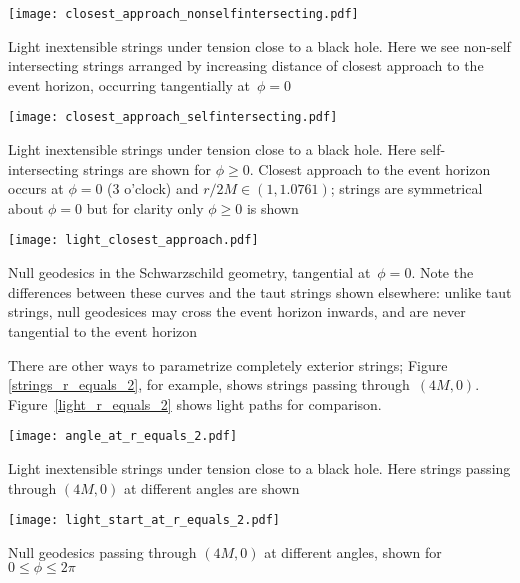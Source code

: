\documentclass{ws-tpe}
\begin{document}
\begin{figurehere} %
  \centerline{
    \texttt{[image: closest\_approach\_nonselfintersecting.pdf]}
  }
  \caption{Light inextensible strings under tension close to a black
    hole.  Here we see non-self intersecting strings arranged by
    increasing distance of closest approach to the event horizon,
    occurring tangentially at~$\phi=0$}
  \label{closest_approach_non_self_intersecting}
\end{figurehere}

\begin{figurehere} %
  \centerline{
    \texttt{[image: closest\_approach\_selfintersecting.pdf]}
  }
  \caption{Light inextensible strings under tension close to a black
    hole.  Here self-intersecting strings are shown for $\phi\geqslant
    0$.  Closest approach to the event horizon occurs at $\phi=0$ (3
    o'clock) and $r/2M\in\left(1,1.0761\right)$; strings are symmetrical
    about $\phi=0$ but for clarity only $\phi\geqslant 0$ is shown}
  \label{closest_approach_self_intersecting}
\end{figurehere}

\begin{figurehere} %
  \centerline{
    \texttt{[image: light\_closest\_approach.pdf]}
  }
  \caption{Null geodesics in the Schwarzschild geometry, tangential
    at~$\phi=0$.  Note the differences between these curves and the taut
    strings shown elsewhere: unlike taut strings, null geodesices may
    cross the event horizon inwards, and are never tangential to the
    event horizon}
  \label{light_closest_approach}
\end{figurehere}

There are other ways to parametrize completely exterior strings;
Figure \ref{strings_r_equals_2}, for example, shows strings passing
through~$(4M,0)$.  Figure~\ref{light_r_equals_2} shows light paths for
comparison.

\begin{figurehere}
  \centerline{
    \texttt{[image: angle\_at\_r\_equals\_2.pdf]} %
  }
  \caption{Light inextensible strings under tension close to a black
    hole.  Here strings passing through $(4M,0)$ at different angles are
    shown}
  \label{strings_r_equals_2}
\end{figurehere}

\begin{figurehere}
  \centerline{
    \texttt{[image: light\_start\_at\_r\_equals\_2.pdf]} %
  }
  \caption{Null geodesics passing through $(4M,0)$ at different angles,
    shown for $0\leqslant\phi\leqslant 2\pi$}
  \label{light_r_equals_2}
\end{figurehere}
\end{document}
